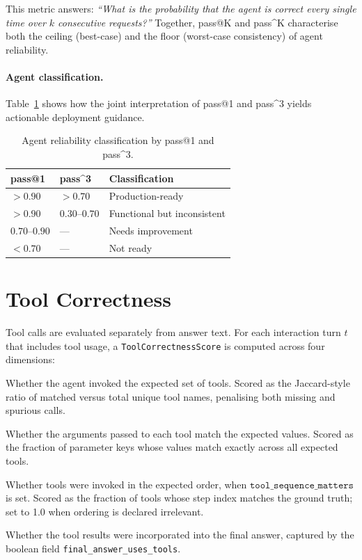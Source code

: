 \documentclass[11pt,a4paper]{article}
\begin{document}
This metric answers: \emph{``What is the probability that the agent is correct
every single time over $k$ consecutive requests?''} Together, pass@K and
pass\^{}K characterise both the ceiling (best-case) and the floor
(worst-case consistency) of agent reliability.

\paragraph{Agent classification.}
Table~\ref{tab:classification} shows how the joint interpretation of pass@1 and
pass\^{}3 yields actionable deployment guidance.

\begin{table}[h]
\centering
\caption{Agent reliability classification by pass@1 and pass\^{}3.}
\label{tab:classification}
\begin{tabular}{lll}
\toprule
\textbf{pass@1} & \textbf{pass\^{}3} & \textbf{Classification} \\
\midrule
$> 0.90$ & $> 0.70$ & Production-ready \\
$> 0.90$ & $0.30$--$0.70$ & Functional but inconsistent \\
$0.70$--$0.90$ & --- & Needs improvement \\
$< 0.70$ & --- & Not ready \\
\bottomrule
\end{tabular}
\end{table}

\section{Tool Correctness}
\label{sec:tool}

Tool calls are evaluated separately from answer text. For each interaction
turn $t$ that includes tool usage, a \texttt{ToolCorrectnessScore} is
computed across four dimensions:

\begin{description}[leftmargin=2em]
    \item[Selection ($s_1$)] Whether the agent invoked the expected set of
    tools. Scored as the Jaccard-style ratio of matched versus total unique
    tool names, penalising both missing and spurious calls.

    \item[Parameters ($s_2$)] Whether the arguments passed to each tool match
    the expected values. Scored as the fraction of parameter keys whose values
    match exactly across all expected tools.

    \item[Sequence ($s_3$)] Whether tools were invoked in the expected order,
    when $\texttt{tool\_sequence\_matters}$ is set. Scored as the fraction of
    tools whose step index matches the ground truth; set to 1.0 when ordering
    is declared irrelevant.

    \item[Utilization ($s_4$)] Whether the tool results were incorporated into
    the final answer, captured by the boolean field
    \texttt{final\_answer\_uses\_tools}.
\end{description}
\end{document}
